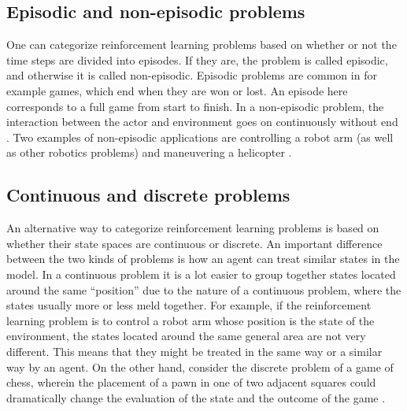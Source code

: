 \subsection{Episodic and non-episodic problems}
One can categorize reinforcement learning problems based on whether or not the time steps are divided into episodes. If they are, the problem is called episodic, and otherwise it is called non-episodic. Episodic problems are common in for example games, which end when they are won or lost. An episode here corresponds to a full game from start to finish. In a non-episodic problem, the interaction between the actor and environment goes on continuously without end \parencite{barto1998reinforcement}. Two examples of non-episodic applications are controlling a robot arm (as well as other robotics problems) and maneuvering a helicopter \parencite{ng2006autonomous}. 

\subsection{Continuous and discrete problems}
An alternative way to categorize reinforcement learning problems is based on whether their state spaces are continuous or discrete. An important difference between the two kinds of problems is how an agent can treat similar states in the model. In a continuous problem it is a lot easier to group together states located around the same ``position'' due to the nature of a continuous problem, where the states usually more or less meld together. For example, if the reinforcement learning problem is to control a robot arm whose position is the state of the environment, the states located around the same general area are not very different. This means that they might be treated in the same way or a similar way by an agent. On the other hand, consider the discrete problem of a game of chess, wherein the placement of a pawn in one of two adjacent squares could dramatically change the evaluation of the state and the outcome of the game \parencite{barto1998reinforcement}.
